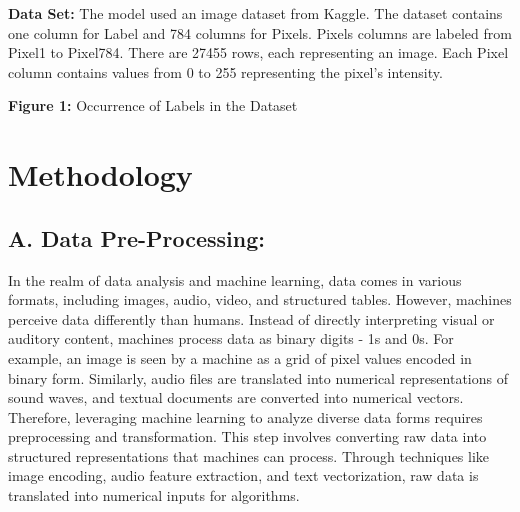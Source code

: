 \documentclass[conference]{IEEEtran}
\begin{document}
\vspace{\baselineskip}

\textbf{Data Set:} The model used an image dataset from Kaggle. The dataset contains one column for Label and 784 columns for Pixels. Pixels columns are labeled from Pixel1 to Pixel784. There are 27455 rows, each representing an image. Each Pixel column contains values from 0 to 255 representing the pixel's intensity.

\begin{center}
  
  \textbf{Figure 1:} Occurrence of Labels in the Dataset
\end{center}

\vspace{\baselineskip}


\section{Methodology}

\vspace{\baselineskip}


\titleformat{\subsection}[runin]{\bfseries}{}{0pt}{}

\subsection{\textbf{A. Data Pre-Processing:}} 
In the realm of data analysis and machine learning, data comes in various formats, including images, audio, video, and structured tables. However, machines perceive data differently than humans. Instead of directly interpreting visual or auditory content, machines process data as binary digits - 1s and 0s.
For example, an image is seen by a machine as a grid of pixel values encoded in binary form. Similarly, audio files are translated into numerical representations of sound waves, and textual documents are converted into numerical vectors.
Therefore, leveraging machine learning to analyze diverse data forms requires preprocessing and transformation. This step involves converting raw data into structured representations that machines can process. Through techniques like image encoding, audio feature extraction, and text vectorization, raw data is translated into numerical inputs for algorithms.
\end{document}
